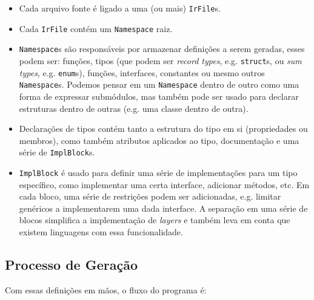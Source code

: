 \begin{itemize}
\item Cada arquivo fonte é ligado a uma (ou mais) \texttt{IrFile}s.
\item Cada \texttt{IrFile} contém um \texttt{Namespace} raiz.
\item \texttt{Namespace}s são responsáveis por armazenar definições a serem geradas, esses podem ser:
  funções, tipos (que podem ser \textit{record types}, e.g. \texttt{struct}s, ou \textit{sum types},
  e.g. \texttt{enum}s), funções, interfaces, constantes ou mesmo outros \texttt{Namespace}s. Podemos
  pensar em um \texttt{Namespace} dentro de outro como uma forma de expressar submódulos, mas também
  pode ser usado para declarar estruturas dentro de outras (e.g. uma classe dentro de outra).
\item Declarações de tipos contém tanto a estrutura do tipo em si (propriedades ou membros), como
  também atributos aplicados ao tipo, documentação e uma série de \texttt{ImplBlock}s.
\item \texttt{ImplBlock} é usado para definir uma série de implementações para um tipo específico,
  como implementar uma certa interface, adicionar métodos, etc. Em cada bloco, uma série de restrições
  podem ser adicionadas, e.g. limitar genéricos a implementarem uma dada interface. A separação em
  uma série de blocos simplifica a implementação de \textit{layers} e também leva em conta que
  existem linguagens com essa funcionalidade.
\end{itemize}


\subsection{Processo de Geração}

Com essas definições em mãos, o fluxo do programa é:

